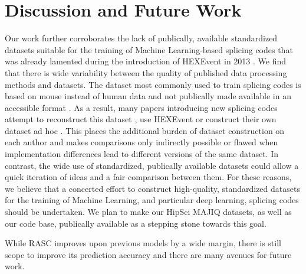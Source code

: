 \section{Discussion and Future Work}
Our work further corroborates 
the lack of publically, available standardized datasets suitable for the training of Machine Learning-based splicing codes that was already lamented during the introduction of HEXEvent in 2013 \cite{hexevent}. We find that there is wide variability between the quality of published data processing methods and datasets.
The dataset most commonly used to train splicing codes is based on mouse instead of human data and not publically made available in an accessible format \cite{jha}. As a result, many papers introducing new splicing codes attempt to reconstruct this dataset \cite{d2vsplicing}, use HEXEvent \cite{dsc} or construct their own dataset ad hoc \cite{cossmo}. This places the additional burden of dataset construction on each author and makes comparisons only indirectly possible or flawed when implementation differences lead to different versions of the same dataset. %
In contrast, the wide use of standardized, publically available datasets could allow a quick iteration of ideas and a fair comparison between them. 
For these reasons, we believe that a concerted effort to construct high-quality, standardized datasets for the training of Machine Learning, and particular deep learning, splicing codes should be undertaken. We plan to make our HipSci MAJIQ datasets, as well as our code base, publically available as a stepping stone towards this goal.


While RASC improves upon previous models by a wide margin, there is still scope to improve its prediction accuracy and there are many avenues for future work. 


